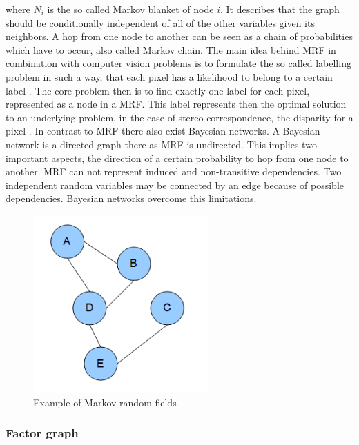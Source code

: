 \noindent where $N_i$ is the so called Markov blanket of node $i$.
It describes that the graph should be conditionally independent of all of the other variables given its neighbors.
A hop from one node to another can be seen as a chain of probabilities which have to occur, also called Markov chain.
The main idea behind MRF in combination with computer vision problems is to formulate the so called labelling problem in such a way, that each pixel has a likelihood to belong to a certain label \citep{tamassia2013handbook}.
The core problem then is to find exactly one label for each pixel, represented as a node in a MRF.
This label represents then the optimal solution to an underlying problem, in the case of stereo correspondence, the disparity for a pixel \citep{cyganek2011introduction}.
\newline\newline\noindent In contrast to MRF there also exist Bayesian networks.
A Bayesian network is a directed graph there as MRF is undirected.
This implies two important aspects, the direction of a certain probability to hop from one node to another.
MRF can not represent induced and non-transitive dependencies.
Two independent random variables may be connected by an edge because of possible dependencies.
Bayesian networks overcome this limitations.

\begin{figure}[h!]
  \centering
  \includegraphics[width=0.6\textwidth]{src/images/mrf-example.png}
  \caption[Example of Markov random fields]{Example of Markov random fields\protect\footnotemark}
  \label{fig:markov}
\end{figure}

\subsubsection{Factor graph}

